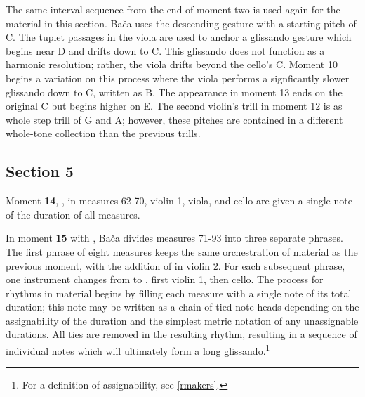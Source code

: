 The same interval sequence from the end of moment two is used again for the material in this section. Bača uses the descending gesture with a starting pitch of C. The tuplet passages in the viola are used to anchor a glissando gesture which begins near D and drifts down to C. This glissando does not function as a harmonic resolution; rather, the viola drifts beyond the cello's C\mysharp. Moment 10 begins a variation on this process where the viola performs a signficantly slower glissando down to C, written as B. The appearance in moment 13 ends on the original C but begins higher on E. The second violin's trill in moment 12 is as whole step trill of G and A; however, these pitches are contained in a different whole-tone collection than the previous trills.


\subsection{Section 5}

Moment \textbf{14}, , in measures 62-70, violin 1, viola, and cello are given a single note of the duration of all measures.

In moment \textbf{15} with , Bača divides measures 71-93 into three separate phrases. The first phrase of eight measures keeps the same orchestration of material  as the previous moment, with the addition of  in violin 2. For each subsequent phrase, one instrument changes from  to , first violin 1, then cello. The process for rhythms in material  begins by filling each measure with a single note of its total duration; this note may be written as a chain of tied note heads depending on the assignability of the duration and the simplest metric notation of any unassignable durations. All ties are removed in the resulting rhythm, resulting in a sequence of individual notes which will ultimately form a long glissando.\footnote{For a definition of assignability, see \vref{rmakers}.}


